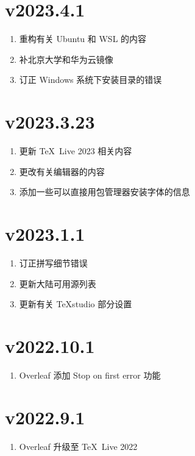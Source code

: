 \section*{v2023.4.1}

\begin{enumerate}
  \item 重构有关 Ubuntu 和 WSL 的内容
  \item 补北京大学和华为云镜像
  \item 订正 Windows 系统下安装目录的错误
\end{enumerate}

\section*{v2023.3.23}

\begin{enumerate}
  \item 更新 \TeX\ Live 2023 相关内容
  \item 更改有关编辑器的内容
  \item 添加一些可以直接用包管理器安装字体的信息
\end{enumerate}

\section*{v2023.1.1}

\begin{enumerate}
  \item 订正拼写细节错误
  \item 更新大陆可用源列表
  \item 更新有关 \TeX studio 部分设置
\end{enumerate}

\section*{v2022.10.1}

\begin{enumerate}
  \item Overleaf 添加 Stop on first error 功能
\end{enumerate}

\section*{v2022.9.1}

\begin{enumerate}
  \item Overleaf 升级至 \TeX\ Live 2022
\end{enumerate}

